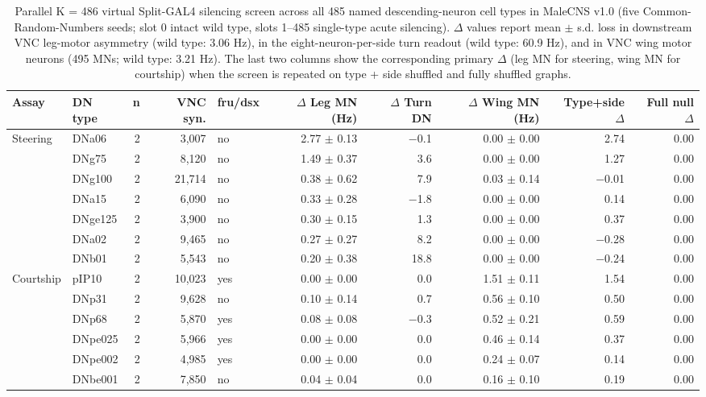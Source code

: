 \documentclass[11pt,a4paper]{article}
\begin{document}
\begin{table}[t]
\centering\small
\caption{Parallel K = 486 virtual Split-GAL4 silencing screen across all 485 named descending-neuron cell types in MaleCNS v1.0 (five Common-Random-Numbers seeds; slot 0 intact wild type, slots 1--485 single-type acute silencing). $\Delta$ values report mean $\pm$ s.d. loss in downstream VNC leg-motor asymmetry (wild type: 3.06 Hz), in the eight-neuron-per-side turn readout (wild type: 60.9 Hz), and in VNC wing motor neurons (495 MNs; wild type: 3.21 Hz). The last two columns show the corresponding primary $\Delta$ (leg MN for steering, wing MN for courtship) when the screen is repeated on type + side shuffled and fully shuffled graphs.}\label{tbl:dnscreen}
\begin{adjustbox}{max width=\textwidth}
\begin{tabular}{llrrlrrrrr}
\toprule
Assay & DN type & n & VNC syn. & fru/dsx & $\Delta$ Leg MN (Hz) & $\Delta$ Turn DN & $\Delta$ Wing MN (Hz) & Type+side $\Delta$ & Full null $\Delta$ \\
\midrule
Steering & DNa06 & 2 & 3,007 & no & 2.77 $\pm$ 0.13 & $-$0.1 & 0.00 $\pm$ 0.00 & 2.74 & 0.00 \\
 & DNg75 & 2 & 8,120 & no & 1.49 $\pm$ 0.37 & 3.6 & 0.00 $\pm$ 0.00 & 1.27 & 0.00 \\
 & DNg100 & 2 & 21,714 & no & 0.38 $\pm$ 0.62 & 7.9 & 0.03 $\pm$ 0.14 & $-$0.01 & 0.00 \\
 & DNa15 & 2 & 6,090 & no & 0.33 $\pm$ 0.28 & $-$1.8 & 0.00 $\pm$ 0.00 & 0.14 & 0.00 \\
 & DNge125 & 2 & 3,900 & no & 0.30 $\pm$ 0.15 & 1.3 & 0.00 $\pm$ 0.00 & 0.37 & 0.00 \\
 & DNa02 & 2 & 9,465 & no & 0.27 $\pm$ 0.27 & 8.2 & 0.00 $\pm$ 0.00 & $-$0.28 & 0.00 \\
 & DNb01 & 2 & 5,543 & no & 0.20 $\pm$ 0.38 & 18.8 & 0.00 $\pm$ 0.00 & $-$0.24 & 0.00 \\
\midrule
Courtship & pIP10 & 2 & 10,023 & yes & 0.00 $\pm$ 0.00 & 0.0 & 1.51 $\pm$ 0.11 & 1.54 & 0.00 \\
 & DNp31 & 2 & 9,628 & no & 0.10 $\pm$ 0.14 & 0.7 & 0.56 $\pm$ 0.10 & 0.50 & 0.00 \\
 & DNp68 & 2 & 5,870 & yes & 0.08 $\pm$ 0.08 & $-$0.3 & 0.52 $\pm$ 0.21 & 0.59 & 0.00 \\
 & DNpe025 & 2 & 5,966 & yes & 0.00 $\pm$ 0.00 & 0.0 & 0.46 $\pm$ 0.14 & 0.37 & 0.00 \\
 & DNpe002 & 2 & 4,985 & yes & 0.00 $\pm$ 0.00 & 0.0 & 0.24 $\pm$ 0.07 & 0.14 & 0.00 \\
 & DNbe001 & 2 & 7,850 & no & 0.04 $\pm$ 0.04 & 0.0 & 0.16 $\pm$ 0.10 & 0.19 & 0.00 \\
\bottomrule
\end{tabular}
\end{adjustbox}
\end{table}
\end{document}
